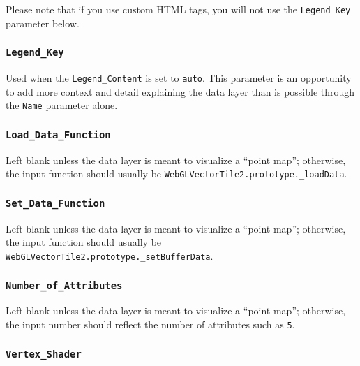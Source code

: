 \documentclass[
  12pt,
]{krantz}
\begin{document}
Please note that if you use custom HTML tags, you will not use the \texttt{Legend\_Key} parameter below.

\hypertarget{legend_key}{%
\subsubsection*{\texorpdfstring{\texttt{Legend\_Key}}{Legend\_Key}}\label{legend_key}}


Used when the \texttt{Legend\_Content} is set to \texttt{auto}. This parameter is an opportunity to add more context and detail explaining the data layer than is possible through the \texttt{Name} parameter alone.

\hypertarget{load_data_function}{%
\subsubsection*{\texorpdfstring{\texttt{Load\_Data\_Function}}{Load\_Data\_Function}}\label{load_data_function}}


Left blank unless the data layer is meant to visualize a ``point map''; otherwise, the input function should usually be \texttt{WebGLVectorTile2.prototype.\_loadData}.

\hypertarget{set_data_function}{%
\subsubsection*{\texorpdfstring{\texttt{Set\_Data\_Function}}{Set\_Data\_Function}}\label{set_data_function}}


Left blank unless the data layer is meant to visualize a ``point map''; otherwise, the input function should usually be \texttt{WebGLVectorTile2.prototype.\_setBufferData}.

\hypertarget{number_of_attributes}{%
\subsubsection*{\texorpdfstring{\texttt{Number\_of\_Attributes}}{Number\_of\_Attributes}}\label{number_of_attributes}}


Left blank unless the data layer is meant to visualize a ``point map''; otherwise, the input number should reflect the number of attributes such as \texttt{5}.

\hypertarget{vertex_shader}{%
\subsubsection*{\texorpdfstring{\texttt{Vertex\_Shader}}{Vertex\_Shader}}\label{vertex_shader}}
\end{document}
